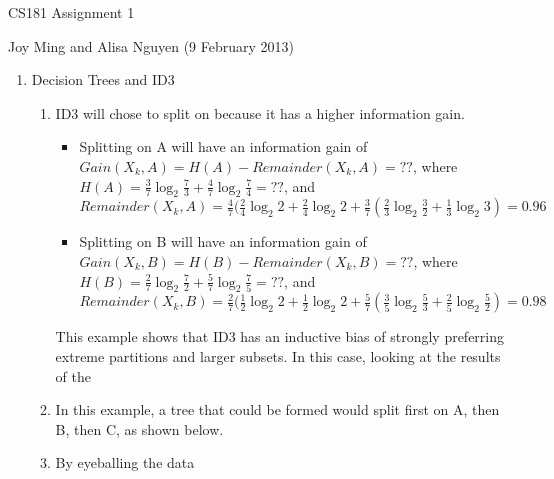 \documentclass[11pt]{article}
\begin{document}
\begin{center}
\large
CS181 Assignment 1
\end{center}
Joy Ming and Alisa Nguyen (9 February 2013)\\

\begin{enumerate}
\setcounter{enumi}{0}

\item Decision Trees and ID3
\begin{enumerate}
\item ID3 will chose to split on  because it has a higher information gain.
	\begin{itemize}
	\item Splitting on A will have an information gain of $Gain(X_k,A)=H(A)-Remainder(X_k,A)=??$, 
		where $H(A) = \frac{3}{7}\log_2 \frac{7}{3} + \frac{4}{7}\log_2\frac{7}{4}=??$, %
		and $Remainder(X_k,A)=\frac{4}{7}(\frac{2}{4}\log_2 2+\frac{2}{4}\log_2 2+\frac{3}{7}(\frac{2}{3}\log_2 \frac{3}{2} + \frac{1}{3}\log_2 3) = 0.96$
	\item Splitting on B will have an information gain of $Gain(X_k,B)=H(B)-Remainder(X_k,B)=??$, 
		where $H(B) = \frac{2}{7}\log_2 \frac{7}{2} + \frac{5}{7}\log_2\frac{7}{5}=??$, %
		and $Remainder(X_k,B)=\frac{2}{7}(\frac{1}{2}\log_2 2+\frac{1}{2}\log_2 2+\frac{5}{7}(\frac{3}{5}\log_2 \frac{5}{3} + \frac{2}{5}\log_2 \frac{5}{2})=0.98$
	\end{itemize}
This example shows that ID3 has an inductive bias of strongly preferring extreme partitions and larger subsets. In this case, looking at the results of the 
\item In this example, a tree that could be formed would split first on A, then B, then C, as shown below.
\item By eyeballing the data
\end{enumerate}


\end{enumerate}
\end{document}
